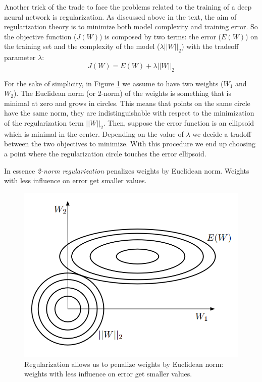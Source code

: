 Another trick of the trade to face the problems related to the training of a deep neural network is regularization. As discussed above in the text, the aim of regularization theory is to minimize both model complexity and training error. So the objective function ($J(W)$) is composed by two terms: the error ($E(W)$) on the training set and the complexity of the model ($\lambda ||W||_2$) with the tradeoff parameter $\lambda$:
$$J(W) = E(W)+\lambda ||W||_2$$

For the sake of simplicity, in Figure \ref{fig:deep_regularization} we assume to have two weights ($W_1$ and $W_2$). The Euclidean norm (or 2-norm) of the weights is something that is minimal at zero and grows in circles. This means that points on the same circle have the same norm, they are indistinguishable with respect to the minimization of the regularization term $||W||_2$. Then, suppose the error function is an ellipsoid which is minimal in the center. Depending on the value of $\lambda$ we decide a tradoff between the two objectives to minimize. With this procedure we end up choosing a point where the regularization circle touches the error ellipsoid. \newline

In essence \textit{2-norm regularization} penalizes weights by Euclidean norm. Weights with less influence on error get smaller values. \newline

\begin{figure}
    \centering
    \includegraphics[scale=0.5]{images/deepRegularization.png}
    \caption{Regularization allows us to penalize weights by Euclidean norm: weights with less influence on error get smaller values.}
    \label{fig:deep_regularization}
\end{figure}

